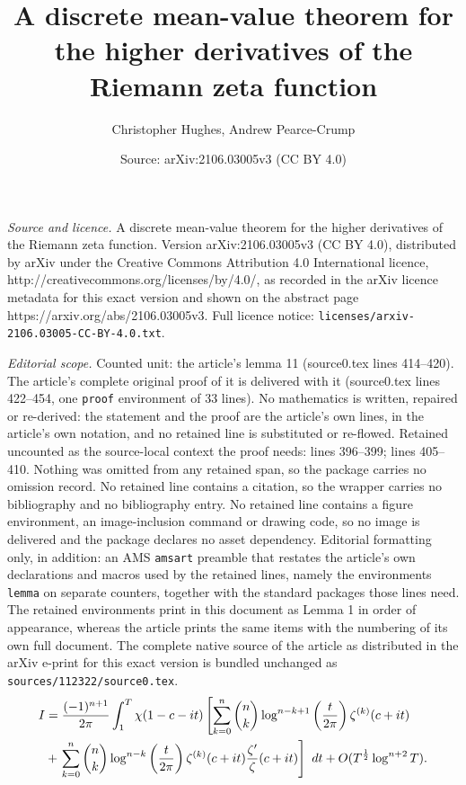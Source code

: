 \documentclass[10pt,a4paper]{amsart}
\title{A discrete mean-value theorem for the higher derivatives of the Riemann zeta function}
\author{Christopher Hughes, Andrew Pearce-Crump}
\date{Source: arXiv:2106.03005v3 (CC BY 4.0)}
\begin{document}
\maketitle

\noindent\emph{Source and licence.} A discrete mean-value theorem for the higher derivatives of the Riemann zeta function. Version arXiv:2106.03005v3 (CC BY 4.0), distributed by arXiv under the Creative Commons Attribution 4.0 International licence, http://creativecommons.org/licenses/by/4.0/, as recorded in the arXiv licence metadata for this exact version and shown on the abstract page https://arxiv.org/abs/2106.03005v3. Full licence notice: \texttt{licenses/arxiv-2106.03005-CC-BY-4.0.txt}.\par\smallskip

\noindent\textit{Editorial scope.} Counted unit: the article's lemma 11 (source0.tex lines 414--420). The article's complete original proof of it is delivered with it (source0.tex lines 422--454, one \texttt{proof} environment of 33 lines). No mathematics is written, repaired or re-derived: the statement and the proof are the article's own lines, in the article's own notation, and no retained line is substituted or re-flowed.  Retained uncounted as the source-local context the proof needs: lines 396--399; lines 405--410.  Nothing was omitted from any retained span, so the package carries no omission record.  No retained line contains a citation, so the wrapper carries no bibliography and no bibliography entry.  No retained line contains a figure environment, an image-inclusion command or drawing code, so no image is delivered and the package declares no asset dependency.  Editorial formatting only, in addition: an AMS \texttt{amsart} preamble that restates the article's own declarations and macros used by the retained lines, namely the environments \texttt{lemma} on separate counters, together with the standard packages those lines need.  The retained environments print in this document as Lemma 1 in order of appearance, whereas the article prints the same items with the numbering of its own full document.  The complete native source of the article as distributed in the arXiv e-print for this exact version is bundled unchanged as \texttt{sources/112322/source0.tex}.
\begin{align}
I &= \frac{(-1)^{n+1}}{2 \pi} \int_{1}^{T} \chi (1 - c - it) \left[ \sum_{k=0}^n \binom{n}{k} \log^{n-k+1} \left( \frac{t}{2 \pi} \right) \zeta^{(k)}(c +it) \right. \notag\\
&+\left. \sum_{k=0}^n \binom{n}{k} \log^{n-k} \left( \frac{t}{2 \pi} \right) \zeta^{(k)}(c+it) \frac{\zeta '}{\zeta} (c +it) \right] \ dt + O(T^{\frac{1}{2}} \log ^{n+2} T). \label{eq:I split}
\end{align}
\end{document}
